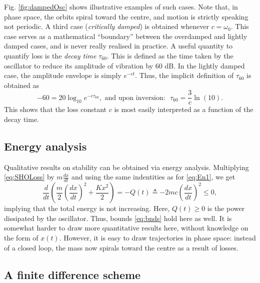\documentclass[11pt,twoside,a4paper,english]{book}
\begin{document}
Fig. \ref{fig:dampedOsc} shows illustrative examples of such cases. Note that, in phase space, the orbits spiral toward the centre, and motion is strictly speaking not periodic.
A third case (\emph{critically damped}) is obtained whenever $c=\omega_0$. This case serves as a mathematical ``boundary'' between the overdamped and lightly damped cases, and is never really realised in practice. A useful quantity to quantify loss is the \emph{decay time} $\tau_{60}$. This is defined as the time taken by the oscillator to reduce its amplitude of vibration by 60 dB. In the lightly damped case, the amplitude envelope is simply $e^{-ct}$. Thus, the implicit definition of $\tau_{60}$ is obtained as
\begin{equation}\label{eq:tau60}
    -60 = 20 \log_{10}e^{-c\tau_{60}}, \,\, \text{and upon inversion: } \,\, \tau_{60} = \frac{3}{c} \ln(10).
\end{equation}
This shows that the loss constant $c$ is most easily interpreted as a function of the decay time.



\subsection{Energy analysis}


Qualitative results on stability can be obtained via energy analysis. Multiplying \eqref{eq:SHOLoss} by $m \frac{dx}{dt}$ and using the same indentities as for \eqref{eq:En1}, we get
\begin{equation}\label{eq:EnBalLoss}
    \frac{d}{dt}\left( \frac{m}{2} \left(\frac{dx}{dt}\right)^2 + \frac{K x^2}{2}   \right) = -Q(t) \triangleq - 2mc \left( \frac{dx}{dt} \right)^2 \leq 0,
\end{equation}
implying that the total energy is not increasing. Here, $Q(t) \geq 0$ is the power dissipated by the oscillator. Thus, bounds \eqref{eq:bnds}  hold here as well. It is somewhat harder to draw more quantitative results here, without knowledge on the form of $x(t).$ However, it is easy to draw trajectories in phase space: instead of a closed loop, the mass now spirals toward the centre as a result of losses. 


\subsection{A finite difference scheme}
\end{document}
